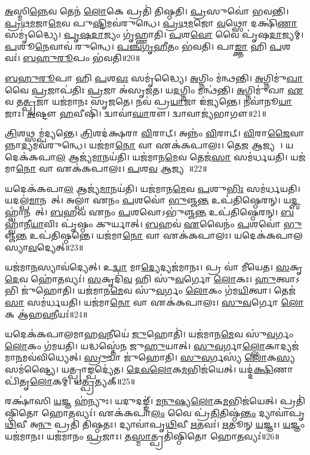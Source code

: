 \ul{𑌅}𑌸𑍍𑌮𑌿\ul{𑌨𑍍𑌨𑍇}𑌵 𑌤𑍇𑌨॑ \ul{𑌲𑍋}𑌕𑍇 𑌪𑍍𑌰𑌤𑌿॑ 𑌤𑌿𑌷𑍍𑌠𑌤𑌿।
\ul{𑌪𑍍𑌰}𑌸𑍁𑌵𑍋॑ 𑌭𑌵𑌨𑍍𑌤𑌿।
\ul{𑌪𑍍𑌰}\ul{𑌥}\ul{𑌮}𑌜𑌾\ul{𑌮𑍇}𑌵 𑌪𑍁\ul{𑌷𑍍𑌟𑌿}𑌮𑌵॑𑌰𑍁𑌨𑍍𑌧𑍇।
\ul{𑌪𑍍𑌰}\ul{𑌥}\ul{𑌮}𑌜𑍋 \ul{𑌵}𑌥𑍍𑌸𑍋 𑌦𑌕𑍍𑌷𑌿॑\ul{𑌣𑌾} 𑌸𑌮𑍃॑𑌦𑍍𑌧𑍍𑌯𑍈।
\ul{𑌪𑍃}\ul{𑌷}\ul{𑌦𑌾}𑌜𑍍𑌯𑌂 𑌗𑍃॑𑌹𑍍𑌣𑌾𑌤𑌿।
\ul{𑌪}𑌶\ul{𑌵𑍋} 𑌵𑍈 𑌪𑍃॑𑌷\ul{𑌦𑌾}𑌜𑍍𑌯𑌮𑍍।
\ul{𑌪}𑌶𑍂\ul{𑌨𑍇}𑌵𑌾𑌵॑ 𑌰𑍁𑌨𑍍𑌧𑍇।
\ul{𑌪}\ul{𑌞𑍍𑌚}\ul{𑌗𑍃}\ul{𑌹𑍀}𑌤𑌂 𑌭॑𑌵𑌤𑌿।
𑌪𑌾\ul{𑌙𑍍𑌕𑍍𑌤𑌾} 𑌹𑌿 \ul{𑌪}𑌶𑌵𑌃॑।
\ul{𑌬}\ul{𑌹𑍁}\ul{𑌰𑍂}𑌪𑌂 𑌭॑𑌵𑌤𑌿॥20॥

\ul{𑌬}\ul{𑌹𑍁}\ul{𑌰𑍂}𑌪𑌾 𑌹𑌿 \ul{𑌪}𑌶\ul{𑌵𑌃} 𑌸𑌮𑍃॑𑌦𑍍𑌧𑍍𑌯𑍈।
\ul{𑌅}𑌗𑍍𑌨𑌿𑌂 𑌮॑𑌨𑍍𑌥𑌨𑍍𑌤𑌿।
\ul{𑌅}𑌗𑍍𑌨𑌿𑌮𑍁॑\ul{𑌖𑌾} 𑌵𑍈 \ul{𑌪𑍍𑌰}𑌜𑌾𑌪॑𑌤𑌿𑌃 \ul{𑌪𑍍𑌰}𑌜𑌾 𑌅॑𑌸𑍃𑌜𑌤।
𑌯\ul{𑌦}𑌗𑍍𑌨𑌿𑌂 𑌮𑌨𑍍𑌥॑𑌨𑍍𑌤𑌿।
\ul{𑌅}𑌗𑍍𑌨𑌿𑌮𑍁॑𑌖𑌾 \ul{𑌏}𑌵 𑌤\ul{𑌤𑍍𑌪𑍍𑌰}𑌜𑌾 𑌯𑌜॑𑌮𑌾𑌨𑌃 𑌸𑍃𑌜𑌤𑍇।
𑌨𑌵॑ 𑌪𑍍𑌰\ul{𑌯𑌾}𑌜𑌾 𑌇॑𑌜𑍍𑌯𑌨𑍍𑌤𑍇।
𑌨𑌵𑌾॑𑌨𑍂\ul{𑌯𑌾}𑌜𑌾𑌃।
\ul{𑌅}𑌷𑍍𑌟𑍗 \ul{𑌹}𑌵𑍀𑌷𑌿॑।
𑌦𑍍𑌵𑌾𑌵𑌾॑\ul{𑌘𑌾}𑌰𑍗।
𑌦𑍍𑌵𑌾𑌵𑌾𑌜𑍍𑌯॑𑌭𑌾𑌗𑍗॥21॥

\ul{𑌤𑍍𑌰𑌿}\ul{}𑌶𑌥𑍍𑌸𑌮𑍍𑌪॑𑌦𑍍𑌯𑌨𑍍𑌤𑍇।
\ul{𑌤𑍍𑌰𑌿}\ul{}𑌶𑌦॑𑌕𑍍𑌷𑌰𑌾 \ul{𑌵𑌿}𑌰𑌾𑌟𑍍।
𑌅𑌨𑍍𑌨𑌂॑ \ul{𑌵𑌿}𑌰𑌾𑌟𑍍।
\ul{𑌵𑌿}𑌰𑌾\ul{𑌜𑍈}𑌵𑌾𑌨𑍍𑌨𑌾\ul{𑌦𑍍𑌯}𑌮𑌵॑𑌰𑍁𑌨𑍍𑌧𑍇।
𑌯𑌜॑𑌮𑌾\ul{𑌨𑍋} 𑌵𑌾 𑌏𑌕॑𑌕𑌪𑌾𑌲𑌃।
𑌤𑍇\ul{𑌜} 𑌆𑌜𑍍𑌯𑌮𑍍᳚।
𑌯𑌦𑍇𑌕॑𑌕𑌪𑌾\ul{𑌲} 𑌆𑌜𑍍𑌯॑\ul{𑌮𑌾}𑌨𑌯॑𑌤𑌿।
𑌯𑌜॑𑌮𑌾𑌨\ul{𑌮𑍇}𑌵 𑌤𑍇𑌜॑\ul{𑌸𑌾} 𑌸𑌮॑𑌰𑍍𑌧𑌯𑌤𑌿।
𑌯𑌜॑𑌮𑌾\ul{𑌨𑍋} 𑌵𑌾 𑌏𑌕॑𑌕𑌪𑌾𑌲𑌃।
\ul{𑌪}𑌶\ul{𑌵} 𑌆𑌜𑍍𑌯𑌮𑍍᳚॥22॥

𑌯𑌦𑍇𑌕॑𑌕𑌪𑌾\ul{𑌲} 𑌆𑌜𑍍𑌯॑\ul{𑌮𑌾}𑌨𑌯॑𑌤𑌿।
𑌯𑌜॑𑌮𑌾𑌨\ul{𑌮𑍇}𑌵 \ul{𑌪}𑌶𑍁\ul{𑌭𑌿𑌃} 𑌸𑌮॑𑌰𑍍𑌧𑌯𑌤𑌿।
𑌯𑌦𑌲𑍍𑌪॑\ul{𑌮𑌾}𑌨𑌯𑍇᳚𑌤𑍍।
𑌅𑌲𑍍𑌪𑌾॑ 𑌏𑌨𑌂 \ul{𑌪}𑌶𑌵𑍋॑ \ul{𑌭𑍁}𑌞𑍍𑌜\ul{𑌨𑍍𑌤} 𑌉𑌪॑𑌤𑌿𑌷𑍍𑌠𑍇𑌰𑌨𑍍।
𑌯\ul{𑌦𑍍𑌬}𑌹𑍍𑌵𑌾॑𑌨𑌯𑍇᳚𑌤𑍍।
\ul{𑌬}𑌹𑌵॑ 𑌏𑌨𑌂 \ul{𑌪}𑌶𑌵𑍋\-𑌽𑌭𑍁॑𑌞𑍍𑌜\ul{𑌨𑍍𑌤} 𑌉𑌪॑𑌤𑌿𑌷𑍍𑌠𑍇𑌰𑌨𑍍।
\ul{𑌬}𑌹𑍍𑌵𑌾॑𑌨𑍀\ul{𑌯𑌾}𑌵𑌿𑌃 𑌪𑍃॑𑌷𑍍𑌠𑌂 𑌕𑍁𑌰𑍍𑌯𑌾𑌤𑍍।
\ul{𑌬}𑌹𑌵॑ \ul{𑌏}𑌵𑍈𑌨𑌂॑ \ul{𑌪}𑌶𑌵𑍋॑ \ul{𑌭𑍁}𑌞𑍍𑌜\ul{𑌨𑍍𑌤} 𑌉𑌪॑𑌤𑌿𑌷𑍍𑌠𑌨𑍍𑌤𑍇।
𑌯𑌜॑𑌮𑌾\ul{𑌨𑍋} 𑌵𑌾 𑌏𑌕॑𑌕𑌪𑌾𑌲𑌃।
𑌯𑌦𑍇𑌕॑𑌕𑌪𑌾𑌲𑌸𑍍𑌯𑌾\ul{𑌵}𑌦𑍍𑌯𑍇𑌤𑍍॥23॥

𑌯𑌜॑𑌮𑌾\ul{𑌨}𑌸𑍍𑌯𑌾𑌵॑𑌦𑍍𑌯𑍇𑌤𑍍।
𑌉\ul{𑌦𑍍𑌵𑌾} 𑌮𑌾\ul{𑌦𑍍𑌯𑍇}𑌦𑍍𑌯𑌜॑𑌮𑌾𑌨𑌃।
𑌪𑍍𑌰 𑌵𑌾॑ 𑌮𑍀𑌯𑍇𑌤।
\ul{𑌸}𑌕𑍃\ul{𑌦𑍇}𑌵 𑌹𑍋॑\ul{𑌤}𑌵𑍍𑌯𑌃॑।
\ul{𑌸}𑌕𑍃𑌦𑌿॑\ul{𑌵} 𑌹𑌿 𑌸𑍁॑\ul{𑌵}𑌰𑍍𑌗𑍋 \ul{𑌲𑍋}𑌕𑌃।
\ul{𑌹𑍁}𑌤𑍍𑌵𑌾𑌽𑌭𑌿 𑌜𑍁॑𑌹𑍋𑌤𑌿।
𑌯𑌜॑𑌮𑌾𑌨\ul{𑌮𑍇}𑌵 𑌸𑍁॑\ul{𑌵}𑌰𑍍𑌗𑌂 \ul{𑌲𑍋}𑌕𑌂 𑌗॑𑌮\ul{𑌯𑌿}𑌤𑍍𑌵𑌾।
𑌤𑍇𑌜॑\ul{𑌸𑌾} 𑌸𑌮॑𑌰𑍍𑌧𑌯𑌤𑌿।
𑌯𑌜॑𑌮𑌾\ul{𑌨𑍋} 𑌵𑌾 𑌏𑌕॑𑌕𑌪𑌾𑌲𑌃।
\ul{𑌸𑍁}\ul{𑌵}𑌰𑍍𑌗𑍋 \ul{𑌲𑍋}𑌕 𑌆॑𑌹\ul{𑌵}𑌨𑍀𑌯𑌃॑॥24॥

𑌯𑌦𑍇𑌕॑𑌕𑌪𑌾𑌲𑌮𑌾𑌹\ul{𑌵}𑌨𑍀𑌯𑍇॑ \ul{𑌜𑍁}𑌹𑍋𑌤𑌿॑।
𑌯𑌜॑𑌮𑌾𑌨\ul{𑌮𑍇}𑌵 𑌸𑍁॑\ul{𑌵}𑌰𑍍𑌗𑌂 \ul{𑌲𑍋}𑌕𑌂 𑌗॑𑌮𑌯𑌤𑌿।
𑌯𑌦𑍍𑌧𑌸𑍍𑌤𑍇॑𑌨 𑌜𑍁\ul{𑌹𑍁}𑌯𑌾𑌤𑍍।
\ul{𑌸𑍁}\ul{𑌵}𑌰𑍍𑌗𑌾\ul{𑌲𑍍𑌲𑍋}𑌕𑌾𑌦𑍍𑌯𑌜॑𑌮𑌾\ul{𑌨}𑌮𑌵॑\-𑌵𑌿𑌧𑍍𑌯𑍇𑌤𑍍।
\ul{𑌸𑍍𑌰𑍁}𑌚𑌾 𑌜𑍁॑𑌹𑍋𑌤𑌿।
\ul{𑌸𑍁}\ul{𑌵}𑌰𑍍𑌗𑌸𑍍𑌯॑ \ul{𑌲𑍋}𑌕\ul{𑌸𑍍𑌯} 𑌸𑌮॑𑌷𑍍𑌟𑍍𑌯𑍈।
𑌯𑌤𑍍𑌪𑍍𑌰𑌾𑌙𑍍𑌪𑌦𑍍𑌯𑍇॑𑌤।
\ul{𑌦𑍇}\ul{𑌵}\ul{𑌲𑍋}𑌕\ul{𑌮}𑌭𑌿𑌜॑𑌯𑍇𑌤𑍍।
𑌯𑌦𑍍𑌦॑\ul{𑌕𑍍𑌷𑌿}𑌣𑌾 𑌪𑌿॑𑌤𑍃\ul{𑌲𑍋}𑌕𑌮𑍍।
𑌯\ul{𑌤𑍍𑌪𑍍𑌰}𑌤𑍍𑌯𑌕𑍍॥25॥

𑌰𑌕𑍍𑌷𑌾॑𑌸𑌿 \ul{𑌯}𑌜𑍍𑌞 𑌹॑𑌨𑍍𑌯𑍁𑌃।
𑌯𑌦𑍁𑌦𑌙𑍍𑌙𑍍॑।
\ul{𑌮}\ul{𑌨𑍁}\ul{𑌷𑍍𑌯}\ul{𑌲𑍋}𑌕\ul{𑌮}𑌭𑌿𑌜॑𑌯𑍇𑌤𑍍।
𑌪𑍍𑌰𑌤𑌿॑\-𑌷𑍍𑌠𑌿𑌤𑍋 𑌹𑍋\ul{𑌤}𑌵𑍍𑌯𑌃॑।
𑌏𑌕॑𑌕𑌪𑌾\ul{𑌲𑌂} 𑌵𑍈 𑌪𑍍𑌰॑\ul{𑌤𑌿}𑌤𑌿𑌷𑍍𑌠॑\ul{𑌨𑍍𑌤𑌂} 𑌦𑍍𑌯𑌾𑌵𑌾॑𑌪𑍃\ul{𑌥𑌿}𑌵𑍀 𑌅\ul{𑌨𑍁} 𑌪𑍍𑌰𑌤𑌿॑ 𑌤𑌿𑌷𑍍𑌠𑌤𑌃।
𑌦𑍍𑌯𑌾𑌵𑌾॑𑌪𑍃\ul{𑌥𑌿}𑌵𑍀 \ul{𑌋}𑌤𑌵𑌃॑।
\ul{𑌋}𑌤𑍂𑌨𑍍 \ul{𑌯}𑌜𑍍𑌞𑌃।
\ul{𑌯}𑌜𑍍𑌞𑌂 𑌯𑌜॑𑌮𑌾𑌨𑌃।
𑌯𑌜॑𑌮𑌾𑌨𑌂 \ul{𑌪𑍍𑌰}𑌜𑌾𑌃।
𑌤\ul{𑌸𑍍𑌮𑌾}𑌤𑍍𑌪𑍍𑌰𑌤𑌿॑\-𑌷𑍍𑌠𑌿𑌤𑍋 𑌹𑍋\ul{𑌤}𑌵𑍍𑌯𑌃॑॥26॥


